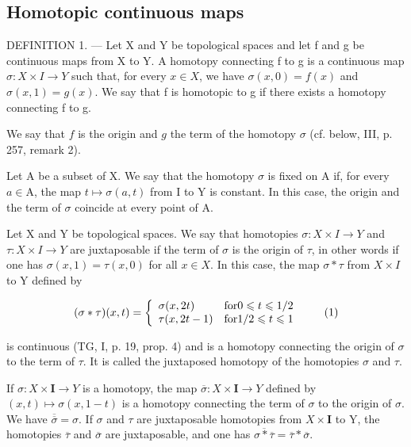 \subsection{Homotopic continuous maps}

DEFINITION 1. --- Let X and Y be topological spaces and let f and g be continuous maps from X to Y. A homotopy connecting f to g is a continuous map \(\sigma: X \times I \to Y\) such that, for every \(x \in X\), we have \(\sigma(x,0) = f(x)\) and \(\sigma(x,1) = g(x)\). We say that f is homotopic to g if there exists a homotopy connecting f to g.

We say that \(f\) is the origin and \(g\) the term of the homotopy \(\sigma\) (cf. below, III, p. 257, remark 2).

Let A be a subset of X. We say that the homotopy \(\sigma\) is fixed on A if, for every \(a \in \mathrm{A}\), the map \(t \mapsto \sigma(a, t)\) from I to Y is constant. In this case, the origin and the term of \(\sigma\) coincide at every point of A.

Let X and Y be topological spaces. We say that homotopies \(\sigma\colon X\times I\to Y\) and \(\tau\colon X\times I\to Y\) are juxtaposable if the term of \(\sigma\) is the origin of \(\tau\), in other words if one has \(\sigma(x,1)=\tau(x,0)\) for all \(x\in X\). In this case, the map \(\sigma*\tau\) from \(X\times I\) to Y defined by

\[
(\sigma * \tau) (x, t) = \left\{ \begin{array}{l l} \sigma (x, 2 t) & \text {for} 0 \leqslant t \leqslant 1 / 2 \\ \tau (x, 2 t - 1) & \text {for} 1 / 2 \leqslant t \leqslant 1 \end{array} \right.\tag{1}
\]

is continuous (TG, I, p. 19, prop. 4) and is a homotopy connecting the origin of \(\sigma\) to the term of \(\tau\). It is called the juxtaposed homotopy of the homotopies \(\sigma\) and \(\tau\).

If \(\sigma\colon X\times\mathbf{I}\to Y\) is a homotopy, the map \(\overline{\sigma}\colon X\times\mathbf{I}\to Y\) defined by \((x,t)\mapsto\sigma(x,1-t)\) is a homotopy connecting the term of \(\sigma\) to the origin of \(\sigma\). We have \(\overline{\overline{\sigma}}=\sigma\). If \(\sigma\) and \(\tau\) are juxtaposable homotopies from \(X\times\mathbf{I}\) to Y, the homotopies \(\overline{\tau}\) and \(\overline{\sigma}\) are juxtaposable, and one has \(\overline{\sigma*\overline{\tau}}=\overline{\tau}*\overline{\sigma}\).

